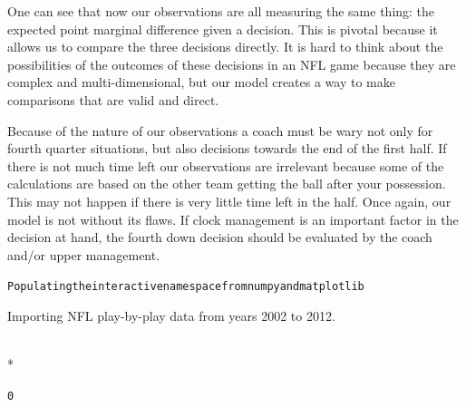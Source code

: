 \documentclass[letterpaper,10pt,english]{/anaconda/lib/python2.7/site-packages/sphinx/texinputs/sphinxhowto}
\def\smaller{\fontsize{9.5pt}{9.5pt}\selectfont}
\newenvironment{InvisibleVerbatim}
        {\begin{mdframed}[leftmargin=0.1\linewidth,innerleftmargin=3pt,innerrightmargin=3pt, userdefinedwidth=1\linewidth, linewidth=0pt, linecolor=white, usetwoside=false]}
        {\end{mdframed}}
\begin{document}
One can see that now our observations are all measuring the same thing:
the expected point marginal difference given a decision. This is pivotal
because it allows us to compare the three decisions directly. It is hard
to think about the possibilities of the outcomes of these decisions in
an NFL game because they are complex and multi-dimensional, but our
model creates a way to make comparisons that are valid and direct.

Because of the nature of our observations a coach must be wary not only
for fourth quarter situations, but also decisions towards the end of the
first half. If there is not much time left our observations are
irrelevant because some of the calculations are based on the other team
getting the ball after your possession. This may not happen if there is
very little time left in the half. Once again, our model is not without
its flaws. If clock management is an important factor in the decision at
hand, the fourth down decision should be evaluated by the coach and/or
upper management.

    

        
        

            
                \begin{InvisibleVerbatim}
                \vspace{-0.5\baselineskip}
\begin{alltt}Populating the interactive namespace from numpy and matplotlib
\end{alltt}

            \end{InvisibleVerbatim}
            
        
    
Importing NFL play-by-play data from years 2002 to 2012.

    

        
        

            
                \makebox[0.1\linewidth]{\smaller\hfill\tt\color{nbframe-out-prompt}Out\hspace{4pt}{[}3{]}:\hspace{4pt}}\\*
                \vspace{-2.55\baselineskip}\begin{InvisibleVerbatim}
                \vspace{-0.5\baselineskip}
\begin{alltt}0\end{alltt}

            \end{InvisibleVerbatim}
            
\end{document}
